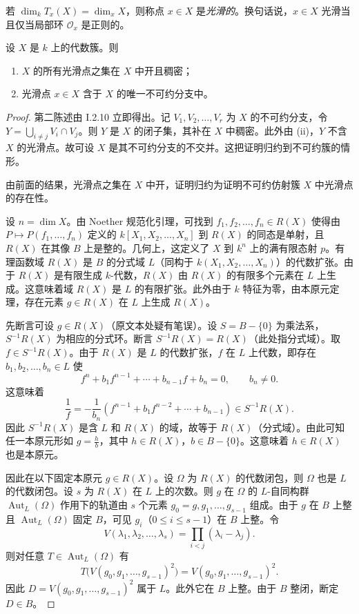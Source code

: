 若 $\dim_kT_x(X)=\dim_xX$，则称点 $x\in X$ 是\emph{光滑的}。换句话说，$x\in X$ 光滑当且仅当局部环 $\mathcal{O}_x$ 是正则的。

\begin{theorem}
设 $X$ 是 $k$ 上的代数簇。则
\begin{enumerate}[label=(\roman*)]
  \item $X$ 的所有光滑点之集在 $X$ 中开且稠密；
  \item 光滑点 $x\in X$ 含于 $X$ 的唯一不可约分支中。
\end{enumerate}
\end{theorem}

\begin{proof}
第二陈述由 I.2.10 立即得出。记 $V_1,V_2,\dots,V_r$ 为 $X$ 的不可约分支，令 $Y=\bigcup_{i\neq j}V_i\cap V_j$。则 $Y$ 是 $X$ 的闭子集，其补在 $X$ 中稠密。此外由 (ii)，$Y$ 不含 $X$ 的光滑点。故可设 $X$ 是其不可约分支的不交并。这把证明归约到不可约簇的情形。

由前面的结果，光滑点之集在 $X$ 中开，证明归约为证明不可约仿射簇 $X$ 中光滑点的存在性。

设 $n=\dim X$。由 Noether 规范化引理，可找到 $f_1,f_2,\dots,f_n\in R(X)$ 使得由 $P\longmapsto P(f_1,\dots,f_n)$ 定义的 $k[X_1,X_2,\dots,X_n]$ 到 $R(X)$ 的同态是单射，且 $R(X)$ 在其像 $B$ 上是整的。几何上，这定义了 $X$ 到 $k^n$ 上的满有限态射 $p$。有理函数域 $R(X)$ 是 $B$ 的分式域 $L$（同构于 $k(X_1,X_2,\dots,X_n)$）的代数扩张。由于 $R(X)$ 是有限生成 $k$-代数，$R(X)$ 由 $R(X)$ 的有限多个元素在 $L$ 上生成。这意味着域 $R(X)$ 是 $L$ 的有限扩张。此外由于 $k$ 特征为零，由本原元定理，存在元素 $g\in R(X)$ 在 $L$ 上生成 $R(X)$。

先断言可设 $g\in R(X)$（原文本处疑有笔误）。设 $S=B-\{0\}$ 为乘法系，$S^{-1}R(X)$ 为相应的分式环。断言 $S^{-1}R(X)=R(X)$（此处指分式域）。取 $f\in S^{-1}R(X)$。由于 $R(X)$ 是 $L$ 的代数扩张，$f$ 在 $L$ 上代数，即存在 $b_1,b_2,\dots,b_n\in L$ 使
$$f^n+b_1f^{n-1}+\cdots+b_{n-1}f+b_n=0,\qquad b_n\neq 0.$$
这意味着
$$\frac{1}{f}=-\frac{1}{b_n}(f^{n-1}+b_1f^{n-2}+\cdots+b_{n-1})\in S^{-1}R(X).$$
因此 $S^{-1}R(X)$ 是含 $L$ 和 $R(X)$ 的域，故等于 $R(X)$（分式域）。由此可知任一本原元形如 $g=\frac{h}{b}$，其中 $h\in R(X)$，$b\in B-\{0\}$。这意味着 $h\in R(X)$ 也是本原元。

因此在以下固定本原元 $g\in R(X)$。设 $\Omega$ 为 $R(X)$ 的代数闭包，则 $\Omega$ 也是 $L$ 的代数闭包。设 $s$ 为 $R(X)$ 在 $L$ 上的次数。则 $g$ 在 $\Omega$ 的 $L$-自同构群 $\operatorname{Aut}_L(\Omega)$ 作用下的轨道由 $s$ 个元素 $g_0=g,g_1,\dots,g_{s-1}$ 组成。由于 $g$ 在 $B$ 上整且 $\operatorname{Aut}_L(\Omega)$ 固定 $B$，可见 $g_i$（$0\le i\le s-1$）在 $B$ 上整。令
$$V(\lambda_1,\lambda_2,\dots,\lambda_s)=\prod_{i<j}(\lambda_i-\lambda_j).$$
则对任意 $T\in\operatorname{Aut}_L(\Omega)$ 有
$$T\bigl(V(g_0,g_1,\dots,g_{s-1})^2\bigr)=V(g_0,g_1,\dots,g_{s-1})^2.$$
因此 $D=V(g_0,g_1,\dots,g_{s-1})^2$ 属于 $L$。此外它在 $B$ 上整。由于 $B$ 整闭，断定 $D\in B$。


\end{proof}
